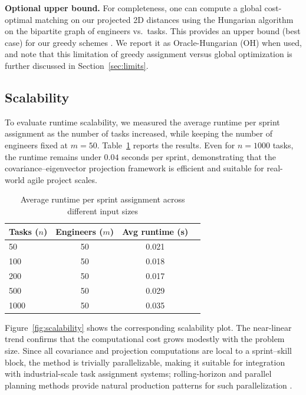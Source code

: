 \documentclass[journal]{IEEEtran}
\begin{document}
\noindent\textbf{Optional upper bound.} 
For completeness, one can compute a global cost-optimal matching on our projected 2D distances using the Hungarian algorithm on the bipartite graph of engineers vs.\ tasks. 
This provides an upper bound (best case) for our greedy schemes \cite{kuhn1955hungarian,munkres1957algorithms,BurkardAssignmentBook}. 
We report it as Oracle-Hungarian (OH) when used, and note that this limitation of greedy assignment versus global optimization is further discussed in Section~\ref{sec:limits}.

\subsection{Scalability}
\label{sec:scalability}

To evaluate runtime scalability, we measured the average runtime per sprint assignment as the number of tasks increased, while keeping the number of engineers fixed at $m=50$. 
Table~\ref{tab:runtime} reports the results. Even for $n=1000$ tasks, the runtime remains under $0.04$ seconds per sprint, demonstrating that the covariance–eigenvector projection framework is efficient and suitable for real-world agile project scales.

\begin{table}[H]
    \centering
    \caption{Average runtime per sprint assignment across different input sizes}
    \label{tab:runtime}
    \begin{tabular}{lccc}
    \toprule
    Tasks ($n$) & Engineers ($m$) & Avg runtime (s) \\
    \midrule
    50   & 50 & 0.021 \\
    100  & 50 & 0.018 \\
    200  & 50 & 0.017 \\
    500  & 50 & 0.029 \\
    1000 & 50 & 0.035 \\
    \bottomrule
    \end{tabular}
\end{table}

Figure~\ref{fig:scalability} shows the corresponding scalability plot. The near-linear trend confirms that the computational cost grows modestly with the problem size. Since all covariance and projection computations are local to a sprint–skill block, the method is trivially parallelizable, making it suitable for integration with industrial-scale task assignment systems; rolling-horizon and parallel planning methods provide natural production patterns for such parallelization \cite{RollingHorizonSurvey2010,WorkforceSchedSurvey2015}.
\end{document}
